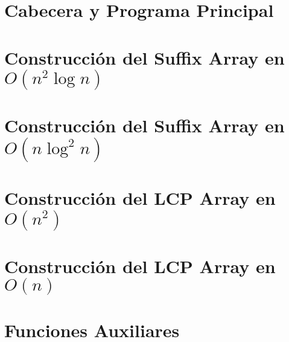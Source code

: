\documentclass{article}
\newcommand{\filepath}{../suffixArray.cpp}
\newcommand{\code}[2]{}
\begin{document}
\section{Cabecera y Programa Principal}
\code{0}{88}

\newpage
\section{Construcción del Suffix Array en $O(n^2\log{n})$}
\code{90}{123}

\newpage
\section{Construcción del Suffix Array en $O(n\log^2{n})$}
\code{125}{211}

\newpage
\section{Construcción del LCP Array en  $O(n^2)$}
\code{213}{240}

\newpage
\section{Construcción del LCP Array en $O(n)$}
\code{242}{291}

\newpage
\section{Funciones Auxiliares}
\code{293}{331}
\end{document}

